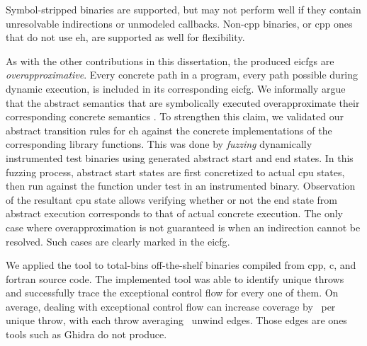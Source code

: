Symbol-stripped binaries are supported, but may not perform well if they contain unresolvable indirections or unmodeled callbacks.
Non-\gls{cpp} binaries, or \gls{cpp} ones that do not use \ac{eh}, are supported as well for flexibility.

As with the other contributions in this dissertation, the produced \acp{eicfg} are \emph{overapproximative}.
Every concrete path in a program, every path possible during dynamic execution, is included in its corresponding \ac{eicfg}.
We informally argue that the abstract semantics that are symbolically executed overapproximate their corresponding concrete semantics \autocite{cousot1996abstract}.
To strengthen this claim, we validated our abstract transition rules for \ac{eh} against the concrete implementations of the corresponding library functions.
This was done by \emph{fuzzing} dynamically instrumented test binaries using generated abstract start and end states.
In this fuzzing process, abstract start states are first concretized to actual \ac{cpu} states, then run against the function under test in an instrumented binary.
Observation of the resultant \ac{cpu} state allows verifying whether or not the end state from abstract execution corresponds to that of actual concrete execution.
The only case where overapproximation is not guaranteed is when an indirection cannot be resolved.
Such cases are clearly marked in the \ac{eicfg}.

We applied the tool to \gls{total-bins} off-the-shelf binaries compiled from \gls{cpp}, \gls{c}, and \gls{fortran} source code.
The implemented tool was able to identify  unique throws and successfully trace the exceptional control flow for every one of them.
On average, dealing with exceptional control flow can increase coverage by \avgdiffinst\ per unique throw, with each throw averaging \avgunwinds\ unwind edges.
Those edges are ones tools such as Ghidra \autocite{ghidra} do not produce.

